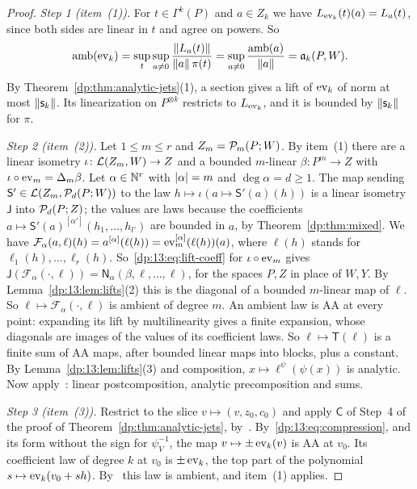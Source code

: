 \begin{proof}
\emph{Step 1 (item~(1)).} For $t\in\Gamma^k(P)$ and $a\in Z_k$ we have $L_{\operatorname{ev}_k}(t)(a)=L_a(t)$, since both sides are linear in $t$ and agree on powers. So
\[
 \operatorname{amb}(\operatorname{ev}_k)=\sup_t\sup_{a\ne0}\frac{\lVert L_a(t)\rVert}{\lVert a\rVert\,\pi(t)}=\sup_{a\ne0}\frac{\operatorname{amb}(a)}{\lVert a\rVert}=\mathfrak a_k(P,W).
\]
By Theorem~\ref{dp:thm:analytic-jets}(1), a section gives a lift of $\operatorname{ev}_k$ of norm at most $\lVert \mathsf s_k\rVert$. Its linearization on $P^{\otimes k}$ restricts to $L_{\operatorname{ev}_k}$, and it is bounded by $\lVert \mathsf s_k\rVert$ for $\pi$.

\emph{Step 2 (item~(2)).} Let $1\le m\le r$ and $Z_m=\mathcal P_m(P;W)$. By item~(1) there are a linear isometry $\iota\colon\mathcal L(Z_m,W)\to Z$ and a bounded $m$-linear $\beta\colon P^m\to Z$ with $\iota\circ\operatorname{ev}_m=\Delta_m\beta$. Let $\alpha\in\mathbb N^r$ with $\lvert \alpha\rvert=m$ and $\deg\alpha=d\ge1$. The map sending $\mathsf S'\in\mathcal L(Z_m,\mathcal P_d(P;W))$ to the law $h\mapsto\iota(a\mapsto\mathsf S'(a)(h))$ is a linear isometry $\mathsf J$ into $\mathcal P_d(P;Z)$; the values are laws because the coefficients $a\mapsto\mathsf S'(a)^{[\alpha']}(h_1,\dots,h_{l'})$ are bounded in $a$, by Theorem~\ref{dp:thm:mixed}. We have $\mathcal F_\alpha(a,\ell)(h)=a^{[\alpha]}(\ell(h))=\operatorname{ev}_m^{[\alpha]}(\ell(h))(a)$, where $\ell(h)$ stands for $\ell_1(h),\dots,\ell_r(h)$. So~\eqref{dp:13:eq:lift-coeff} for $\iota\circ\operatorname{ev}_m$ gives $\mathsf J(\mathcal F_\alpha({\cdot},\ell))=\mathsf N_\alpha(\beta,\ell,\dots,\ell)$, for the spaces $P,Z$ in place of $W,Y$. By Lemma~\ref{dp:13:lem:lifts}(2) this is the diagonal of a bounded $m$-linear map of $\ell$. So $\ell\mapsto\mathcal F_\alpha({\cdot},\ell)$ is ambient of degree $m$. An ambient law is AA at every point: expanding its lift by multilinearity gives a finite expansion, whose diagonals are images of the values of its coefficient laws. So $\ell\mapsto\mathsf T(\ell)$ is a finite sum of AA maps, after bounded linear maps into blocks, plus a constant. By Lemma~\ref{dp:13:lem:lifts}(3) and composition, $x\mapsto\ell^\psi(\psi(x))$ is analytic. Now apply~\cite[Proposition~14.12(1)]{I}: linear postcomposition, analytic precomposition and sums.

\emph{Step 3 (item~(3)).} Restrict to the slice $v\mapsto(v,z_0,c_0)$ and apply $\mathsf C$ of Step~4 of the proof of Theorem~\ref{dp:thm:analytic-jets}, by~\cite[Proposition~14.12(1)]{I}. By~\eqref{dp:13:eq:compression}, and its form without the sign for $\psi_V^{-1}$, the map $v\mapsto\pm\operatorname{ev}_k(v)$ is AA at $v_0$. Its coefficient law of degree $k$ at $v_0$ is $\pm\operatorname{ev}_k$, the top part of the polynomial $s\mapsto\operatorname{ev}_k(v_0+sh)$. By~\cite[Proposition~14.9(1)]{I} this law is ambient, and item~(1) applies.


\end{proof}
